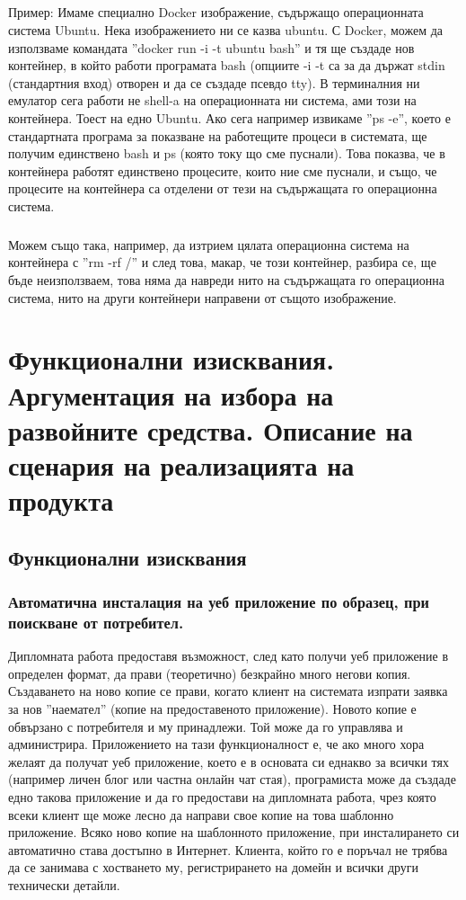 \documentclass[pdftex,14pt,a4paper]{extreport}
\begin{document}
\paragraph {}

Пример: Имаме специално Docker изображение, съдържащо операционната система Ubuntu. Нека изображението ни се казва ubuntu. С Docker, можем да използваме командата ''docker run -i -t ubuntu bash'' и тя ще създаде нов контейнер, в който работи програмата bash (опциите -i -t са за да държат stdin (стандартния вход) отворен и да се създаде псевдо tty). В терминалния ни емулатор сега работи не shell-a на операционната ни система, ами този на контейнера. Тоест на едно Ubuntu. Ако сега например извикаме ''ps -e'', което е стандартната програма за показване на работещите процеси в системата, ще получим единствено bash и ps (която току що сме пуснали). Това показва, че в контейнера работят единствено процесите, които ние сме пуснали, и също, че процесите на контейнера са отделени от тези на съдържащата го операционна система.

\paragraph {}

Можем също така, например, да изтрием цялата операционна система на контейнера с ''rm -rf /'' и след това, макар, че този контейнер, разбира се, ще бъде неизползваем, това няма да навреди нито на съдържащата го операционна система, нито на други контейнери направени от същото изображение.
\newpage
\clearpage
\chapter {Функционални изисквания. Аргументация на избора на развойните средства. Описание на сценария на реализацията на продукта}
\section {Функционални изисквания}
\subsection {Автоматична инсталация на уеб приложение по образец, при поискване от потребител.}
Дипломната работа предоставя възможност, след като получи уеб приложение в определен формат, да прави (теоретично) безкрайно много негови копия. Създаването на ново копие се прави, когато клиент на системата изпрати заявка за нов ''наемател'' (копие на предоставеното приложение). Новото копие е обвързано с потребителя и му принадлежи. Той може да го управлява и администрира. Приложението на тази функционалност е, че ако много хора желаят да получат уеб приложение, което е в основата си еднакво за всички тях (например личен блог или частна онлайн чат стая), програмиста може да създаде едно такова приложение и да го предостави на дипломната работа, чрез която всеки клиент ще може лесно да направи свое копие на това шаблонно приложение. Всяко ново копие на шаблонното приложение, при инсталирането си автоматично става достъпно в Интернет. Клиента, който го е поръчал не трябва да се занимава с хостването му, регистрирането на домейн и всички други технически детайли.
\end{document}
